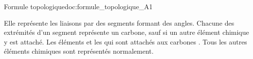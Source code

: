 \begin{doc}{Formule topologique}{doc:formule_topologique_A1}
  \begin{importants}  
    Elle représente les liaisons  par des segments formant des angles.
    Chacune des extrémités d'un segment représente un carbone, sauf si un autre élément chimique y est attaché.
    Les éléments  et les  qui sont attachés aux carbones .
    Tous les autres éléments chimiques sont représentés normalement.
  \end{importants}

  \exemple*
  \vspace*{-20pt}
  \begin{center}
    \qq{}
    \qq{}
  \end{center}
\end{doc}

